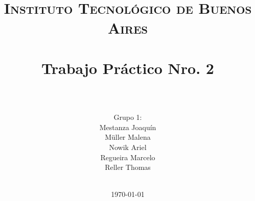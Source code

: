 









\title{
	\normalfont \normalsize \textsc{Instituto Tecnológico de Buenos Aires} \\ [25pt]
	\horrule{2pt} \\[0.4cm]
	\huge Trabajo Pr\'actico Nro. 2\\
	\horrule{2pt} \\[0cm]
\author{Grupo 1:\\Mestanza Joaqu\'in\\ Müller Malena\\Nowik Ariel\\ Regueira Marcelo \\Reller Thomas\\ \\ }
}
\date{\today} %

\maketitle
\newpage


%
%
%
%
%
%
%


